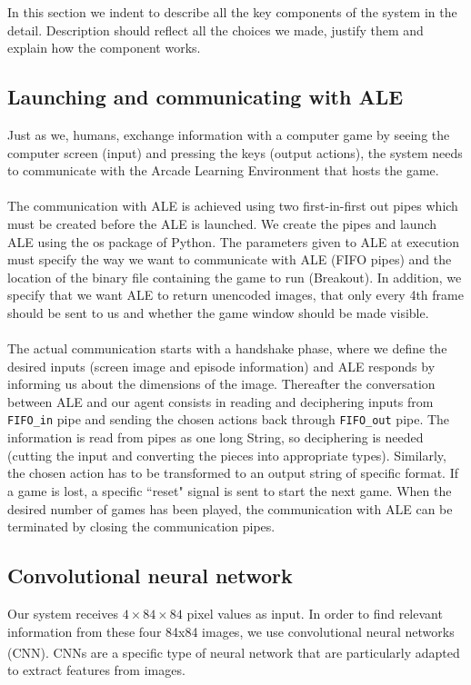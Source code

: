 \documentclass[a4paper,12pt]{article}
\begin{document}
In this section we indent to describe all the key components of the system in the detail. Description should reflect all the choices we made, justify them and explain how the component works.



\subsection{Launching and communicating with ALE}
Just as we, humans, exchange information with a computer game by seeing the computer screen (input) and pressing the keys (output actions), the system needs to communicate with the Arcade Learning Environment that hosts the game.
\paragraph{}
The communication with ALE is achieved using two first-in-first out pipes which must be created before the ALE is launched. We create the pipes and launch ALE using the os package of Python. The parameters given to ALE at execution must specify the way we want to communicate with ALE (FIFO pipes) and the location of the binary file containing the game to run (Breakout). In addition, we specify that we want ALE to return unencoded images, that only every 4th frame should be sent to us and whether the game window should be made visible.


\paragraph{}
The actual communication starts with a handshake phase, where we define the desired inputs (screen image and episode information) and ALE responds by informing us about the dimensions of the image. Thereafter the conversation between ALE and our agent consists in reading and deciphering inputs from \texttt{FIFO\_in} pipe and sending the chosen actions back through \texttt{FIFO\_out} pipe. The information is read from pipes as one long String, so deciphering is needed (cutting the input and converting the pieces into appropriate types). Similarly, the chosen action has to be transformed to an output string of specific format. If a game is lost, a specific ``reset" signal is sent to start the next game. When the desired number of games has been played, the communication with ALE can be terminated by closing the communication pipes. 



\subsection{Convolutional neural network}
Our system receives $4 \times 84 \times 84$ pixel values as input. In order to find relevant information from these four 84x84 images, we use convolutional neural networks (CNN)\textsuperscript{\cite{lecun1995convolutional}}. CNNs are a specific type of neural network that are particularly adapted to extract features from images.
\end{document}

